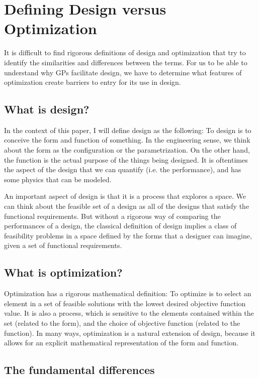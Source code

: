 \section{Defining Design versus Optimization} \label{s:DesVsOpt}

It is difficult to find rigorous definitions of design and optimization that
try to identify the similarities and differences between the terms. For us to be
able to understand why \gls{GP}s facilitate design, we have to determine what 
features of optimization create barriers to entry for its use in design. 

\subsection{What is design?}

In the context of this paper, I will define design as the following:
To design is to conceive the form and function of something.
In the engineering sense, we think about the form as the configuration or
the parametrization. On the other hand, the function is the actual purpose of the things
being designed. It is oftentimes the aspect of the design that we can
quantify (i.e. the performance), and has some physics that can be modeled.

An important aspect of design is that it is a process that explores a space.
We can think about the feasible set of a design as all of the designs
that satisfy the functional requirements. But without a rigorous way of comparing
the performances of a design, the classical
definition of design implies a class of feasibility problems in a space defined by
the forms that a designer can imagine, given a set
of functional requirements. 

\subsection{What is optimization?}

Optimization has a rigorous mathematical definition: To optimize is to select an 
element in a set of feasible solutions with the lowest desired objective
function value. It is also a process, which is sensitive to the elements contained within the set
(related to the form), and the choice of objective function (related to the 
function). In many ways, optimization is a natural extension of design, because it allows
for an explicit mathematical representation of the form and function.

\subsection{The fundamental differences}


